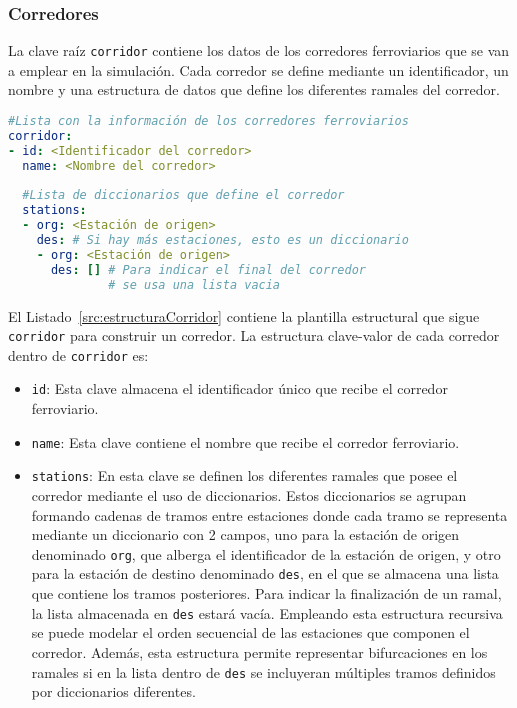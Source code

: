 \subsubsection{Corredores}

La clave raíz \texttt{corridor} contiene los datos de los corredores ferroviarios que se van a emplear en la simulación. Cada corredor se define mediante un identificador, un nombre y una estructura de datos que define los diferentes ramales del corredor.

\begin{lstlisting}[language=YAML,
                   frame=none,
                   numbers=none,
                   basicstyle=\ttfamily\normalsize,
                   caption={Estructura de la clave raíz \texttt{corridor}},
                   label=src:estructuraCorridor,
                   inputencoding=utf8]
#Lista con la información de los corredores ferroviarios
corridor:
- id: <Identificador del corredor>
  name: <Nombre del corredor>
  
  #Lista de diccionarios que define el corredor
  stations:
  - org: <Estación de origen>
    des: # Si hay más estaciones, esto es un diccionario
    - org: <Estación de origen>
      des: [] # Para indicar el final del corredor 
              # se usa una lista vacia
\end{lstlisting}

El Listado~\ref{src:estructuraCorridor} contiene la plantilla estructural que sigue \texttt{corridor} para construir un corredor. La estructura clave-valor de cada corredor dentro de \texttt{corridor} es:

\begin{itemize}
    \item \texttt{id}: Esta clave almacena el identificador único que recibe el corredor ferroviario.
    \item \texttt{name}: Esta clave contiene el nombre que recibe el corredor ferroviario.
    \item \texttt{stations}: En esta clave se definen los diferentes ramales que posee el corredor mediante el uso de diccionarios. Estos diccionarios se agrupan formando cadenas de tramos entre estaciones donde cada tramo se representa mediante un diccionario con 2 campos, uno para la estación de origen denominado \texttt{org}, que alberga el identificador de la estación de origen, y otro para la estación de destino denominado \texttt{des}, en el que se almacena una lista que contiene los tramos posteriores. Para indicar la finalización de un ramal, la lista almacenada en \texttt{des} estará vacía. Empleando esta estructura recursiva se puede modelar el orden secuencial de las estaciones que componen el corredor. Además, esta estructura permite representar bifurcaciones en los ramales si en la lista dentro de \texttt{des} se incluyeran múltiples tramos definidos por diccionarios diferentes. 
\end{itemize}

